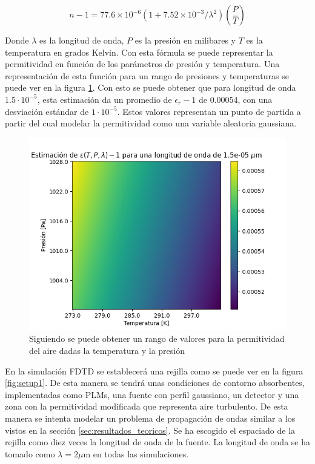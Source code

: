 \begin{equation}
    n - 1 = 77.6\times10^{-6}(1 + 7.52\times10^{-3}/\lambda^2)\left(\frac{P}{T}\right)
\end{equation}

Donde $\lambda$ es la longitud de onda, $P$ es la presión en milibares y $T$ es la temperatura en grados Kelvin. Con esta fórmula se puede representar la permitividad en función de los parámetros de presión y temperatura. Una representación de esta función para un rango de presiones y temperaturas se puede ver en la figura \ref{fig:estimacion_perm_15}. Con esto se puede obtener que para longitud de onda $1.5 \cdot 10^{-5}$, esta estimación da un promedio de $\epsilon_r-1$ de 0.00054, con una desviación estándar de $1\cdot10^{-5}$. Estos valores representan un punto de partida a partir del cual modelar la permitividad como una variable aleatoria gaussiana. 

\begin{figure}[ht]
    \centering
    \includegraphics[width=0.7\linewidth]{figures/estimacion_perm_15.png}
    \caption{Siguiendo \cite{sasiela_electromagnetic_2007} se puede obtener un rango de valores para la permitividad del aire dadas la temperatura y la presión}
    \label{fig:estimacion_perm_15}
\end{figure}

En la simulación FDTD se establecerá una rejilla como se puede ver en la figura \ref{fig:setup1}. De esta manera se tendrá unas condiciones de contorno absorbentes, implementadas como PLMs, una fuente con perfil gaussiano, un detector y una zona con la permitividad modificada que representa aire turbulento. De esta manera se intenta modelar un problema de propagación de ondas similar a los vistos en la sección \ref{sec:resultados_teoricos}. Se ha escogido el espaciado de la rejilla como diez veces la longitud de onda de la fuente. La longitud de onda se ha tomado como $\lambda = 2\mu$m en todas las simulaciones.

